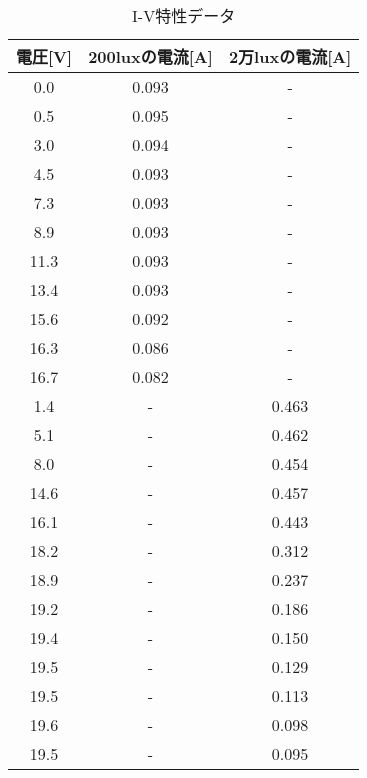 \documentclass[a4paper,11pt,xelatex,ja=standard]{bxjsarticle}
\begin{document}
            \begin{table}[H]
                \centering
                \caption{I-V特性データ}
                \begin{tabular}{|c|c|c|}
                    \hline
                    電圧[V] & 200luxの電流[A] & 2万luxの電流[A] \\
                    \hline
                    0.0 & 0.093 & - \\
                    0.5 & 0.095 & - \\
                    3.0 & 0.094 & - \\
                    4.5 & 0.093 & - \\
                    7.3 & 0.093 & - \\
                    8.9 & 0.093 & - \\
                    11.3 & 0.093 & - \\
                    13.4 & 0.093 & - \\
                    15.6 & 0.092 & - \\
                    16.3 & 0.086 & - \\
                    16.7 & 0.082 & - \\
                    1.4 & - & 0.463 \\
                    5.1 & - & 0.462 \\
                    8.0 & - & 0.454 \\
                    14.6 & - & 0.457 \\
                    16.1 & - & 0.443 \\
                    18.2 & - & 0.312 \\
                    18.9 & - & 0.237 \\
                    19.2 & - & 0.186 \\
                    19.4 & - & 0.150 \\
                    19.5 & - & 0.129 \\
                    19.5 & - & 0.113 \\
                    19.6 & - & 0.098 \\
                    19.5 & - & 0.095 \\
                    \hline
                \end{tabular}
            \end{table}
            
\end{document}
